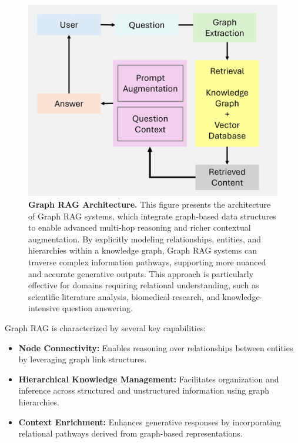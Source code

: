 \begin{figure}[h!]
    \centering
    \includegraphics[width=0.92\linewidth]{images/fig_6.png}
    \caption{
        \textbf{Graph RAG Architecture.}
        This figure presents the architecture of Graph RAG systems, which integrate graph-based data structures to enable advanced multi-hop reasoning and richer contextual augmentation. By explicitly modeling relationships, entities, and hierarchies within a knowledge graph, Graph RAG systems can traverse complex information pathways, supporting more nuanced and accurate generative outputs. This approach is particularly effective for domains requiring relational understanding, such as scientific literature analysis, biomedical research, and knowledge-intensive question answering.
    }
    \label{fig:graphrag}
\end{figure}


Graph RAG is characterized by several key capabilities:
\begin{itemize}
    \item \textbf{Node Connectivity:} Enables reasoning over relationships between entities by leveraging graph link structures.
    \item \textbf{Hierarchical Knowledge Management:} Facilitates organization and inference across structured and unstructured information using graph hierarchies.
    \item \textbf{Context Enrichment:} Enhances generative responses by incorporating relational pathways derived from graph-based representations.
\end{itemize}

